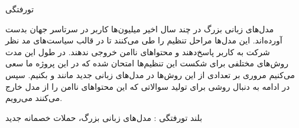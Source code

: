 


‌تورفتگی

مدل‌های زبانی بزرگ در چند سال اخیر میلیون‌ها کاربر در سرتاسر جهان بدست آورده‌اند. این مدل‌ها مراحل تنظیم را طی می‌کنند تا در قالب سیاست‌های مد نظر شرکت به کاربر پاسخ‌دهند و محتواهای ناامن خروجی ندهند. در طول این مدت روش‌های مختلفی برای شکست این تنظیم‌ها امتحان شده که در این پروژه ما سعی می‌کنیم مروری بر تعدادی از این روش‌ها در مدل‌های زبانی جدید مانند  و  بکنیم. سپس در ادامه به دنبال روشی برای تولید سوالاتی که این محتواهای ناامن را از مدل خارج می‌کنند می‌رویم.

‌بلند
‌تورفتگی : 
مدل‌های زبانی بزرگ، حملات خصمانه
‌جدید
